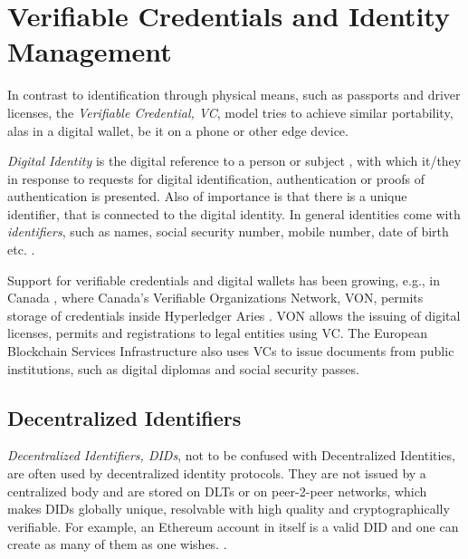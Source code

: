 \section{Verifiable Credentials and Identity Management} %
\label{sec:Verifiable Credentials and Identity Management}
In contrast to identification through physical means, such as passports and driver licenses, the
\textit{Verifiable Credential, VC}, model tries to achieve similar portability, alas in a digital wallet, be it on a
phone or other edge device. \cite{w3c2019verifiablecredentials}

\textit{Digital Identity} is the digital reference to a person or subject \cite{Domingo_2020}, with which it/they in
response to requests for digital identification, authentication or proofs of authentication is presented. Also of
importance is that there is a unique identifier, that is connected to the digital identity.
\cite{Sedlmeir_Smethurst_Rieger_Fridgen_2021}
In general identities come with \textit{identifiers}, such as names, social security number, mobile number, date of
birth etc. \cite{eth-decentralized-identity}.

Support for verifiable credentials and digital wallets has been growing, e.g., in Canada \cite{preukschat2021self},
where Canada's Verifiable Organizations Network, VON, permits storage of credentials inside Hyperledger Aries
\cite{hyperledger:wiki}. VON allows the issuing of digital licenses, permits and registrations to legal entities using
VC.
The European Blockchain Services Infrastructure also uses VCs to issue documents from public institutions, such as
digital diplomas and social security passes. \cite{williams2020cross}

\subsection{Decentralized Identifiers} %
\label{sec:Decentralized Identifiers}
\textit{Decentralized Identifiers, DIDs}, not to be confused with Decentralized Identities, are often used by
decentralized identity protocols. \cite{w3c2022did} They are not issued by a centralized body and are stored on DLTs
or on peer-2-peer networks, which makes DIDs globally unique, resolvable with high quality and cryptographically
verifiable. \cite{w3c-did-primer} For example, an Ethereum account in itself is a valid DID and one can create as many
of them as one wishes. \cite{eth-decentralized-identity}.

